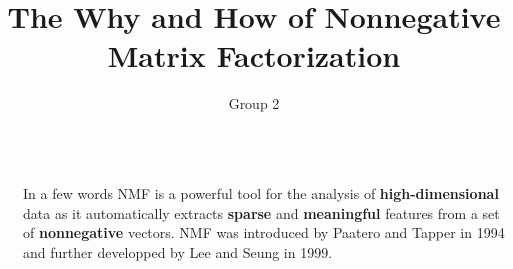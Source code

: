 \documentclass[final]{beamer}
\title{The Why and How of Nonnegative Matrix Factorization} %
\author{Group 2} %
\institute{École Polytechnique de Louvain, UCLouvain} %
\newlength{\sepwid}
\newlength{\threecolwid}
\begin{document}

\setlength{\belowcaptionskip}{2ex} %
\setlength\belowdisplayshortskip{2ex} %
\begin{frame} %


  \begin{columns}[t]
   \begin{column}{\linewidth}
    \vskip0.5cm
    \centering
   \end{column}
  \end{columns}
 \vspace{2cm}


\begin{columns}[t] %
\begin{column}{\sepwid}
\end{column} %
\begin{column}{\threecolwid}


\begin{exampleblock}{In a few words}
NMF is a powerful tool for the analysis of \textbf{high-dimensional} data as it automatically extracts \textbf{sparse} and \textbf{meaningful} features from a set of \textbf{nonnegative} vectors.
NMF was introduced by Paatero and Tapper %
in 1994 and further developped by Lee and Seung %
in 1999.
\end{exampleblock}


\end{column}
\end{columns}
\end{frame}
\end{document}

